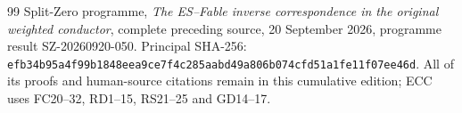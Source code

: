 \documentclass[11pt]{article}
\begin{document}
\begin{thebibliography}{99}
 Split-Zero programme,
\emph{The ES--Fable inverse correspondence in the original weighted
conductor}, complete preceding source, 20 September 2026,
programme result SZ-20260920-050. Principal SHA-256:
\texttt{efb34b95a4f99b1848eea9ce7f4c285aabd49a806b074cfd51a1fe11f07ee46d}.
All of its proofs and human-source citations remain in this cumulative
edition; ECC uses FC20--32, RD1--15, RS21--25 and GD14--17.

\end{thebibliography}
\end{document}
